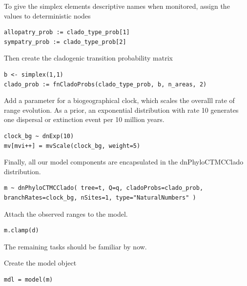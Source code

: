 To give the simplex elements descriptive names when monitored, assign the values to deterministic nodes

\begin{snugshade}
\begin{lstlisting}
allopatry_prob := clado_type_prob[1]
sympatry_prob := clado_type_prob[2]
\end{lstlisting}
\end{snugshade}

Then create the cladogenic transition probability matrix

\begin{snugshade}
\begin{lstlisting}
b <- simplex(1,1)
clado_prob := fnCladoProbs(clado_type_prob, b, n_areas, 2)
\end{lstlisting}
\end{snugshade}

Add a parameter for a biogeographical clock, which scales the overalll rate of range evolution.
As a prior, an exponential distribution with rate 10 generates one dispersal or extinction event per 10 million years.

\begin{snugshade}
\begin{lstlisting}
clock_bg ~ dnExp(10)
mv[mvi++] = mvScale(clock_bg, weight=5)
\end{lstlisting}
\end{snugshade}

Finally, all our model components are encapsulated in the dnPhyloCTMCClado distribution.

\begin{snugshade}
\begin{lstlisting}
m ~ dnPhyloCTMCClado( tree=t, Q=q, cladoProbs=clado_prob, branchRates=clock_bg, nSites=1, type="NaturalNumbers" )
\end{lstlisting}
\end{snugshade}

Attach the observed ranges to the model.

\begin{snugshade}
\begin{lstlisting}
m.clamp(d)
\end{lstlisting}
\end{snugshade}

The remaining tasks should be familiar by now.

Create the model object

\begin{snugshade}
\begin{lstlisting}
mdl = model(m)
\end{lstlisting}
\end{snugshade}

